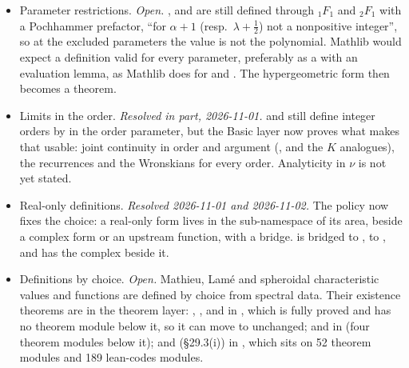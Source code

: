 \documentclass[11pt,a4paper]{article}
\newcommand{\resolved}[1]{\textit{Resolved #1.}}
\newcommand{\open}{\textit{Open.}}
\begin{document}
\begin{itemize}
  \item Parameter restrictions. \open{} ,  and
     are still defined through \({}_1F_1\) and \({}_2F_1\) with a
    Pochhammer prefactor, ``for \(\alpha+1\) (resp.\ \(\lambda+\tfrac12\)) not a nonpositive
    integer'', so at the excluded parameters the value is not the polynomial. Mathlib would
    expect a definition valid for every parameter, preferably as a  with an
    evaluation lemma, as Mathlib does for  and
    . The hypergeometric form then becomes a theorem.
  \item Limits in the order. \resolved{in part, 2026-11-01}  and 
    still define integer orders by  in the order parameter, but the Basic layer
    now proves what makes that usable: joint continuity in order and argument
    (,  and the \(K\)
    analogues), the recurrences and the Wronskians for every order. Analyticity in \(\nu\) is
    not yet stated.
  \item Real-only definitions. \resolved{2026-11-01 and 2026-11-02} The policy now fixes the
    choice: a real-only form lives in the  sub-namespace of its area, beside a
    complex form or an upstream function, with a bridge. 
    is bridged to ,  to
    , and  has the complex
     beside it.
  \item Definitions by choice. \open{} Mathieu, Lam\'e and spheroidal characteristic values
    and functions are defined by choice from spectral data. Their existence theorems are in
    the theorem layer: , ,
     and  in ,
    which is fully proved and has no theorem module below it, so it can move to
     unchanged;  and
     in  (four
    theorem modules below it); and  (\S29.3(i)) in
    , which sits on 52 theorem modules and 189 lean-codes
    modules.
\end{itemize}
\end{document}
